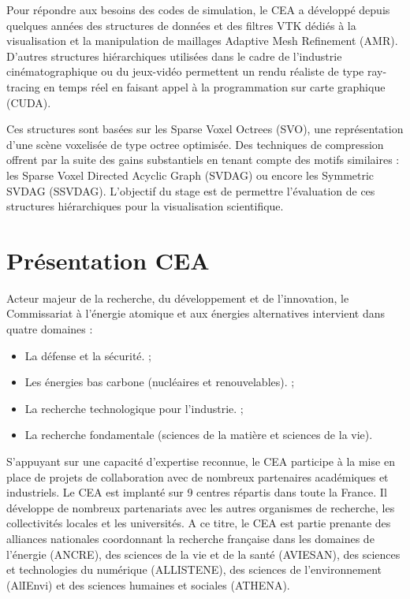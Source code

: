 \documentclass[12pt,a4paper,twoside]{article}
\begin{document}
    Pour répondre aux besoins des codes de simulation, le CEA a développé depuis quelques années des
    structures de données et des filtres VTK dédiés à la visualisation et la manipulation de maillages Adaptive Mesh Refinement (AMR). D’autres
    structures hiérarchiques utilisées dans le cadre de l’industrie cinématographique ou du jeux-vidéo permettent un rendu
    réaliste de type ray-tracing en temps réel en faisant appel à la programmation sur carte graphique (CUDA).

    Ces structures
    sont basées sur les Sparse Voxel Octrees (SVO), une représentation d’une scène voxelisée de type octree optimisée.
    Des techniques de compression offrent par la suite des gains substantiels en tenant compte des motifs similaires :
    les Sparse Voxel Directed Acyclic Graph (SVDAG) ou encore les Symmetric SVDAG (SSVDAG).
    L’objectif du stage est de permettre l’évaluation de ces structures hiérarchiques pour la visualisation scientifique.

    \newpage

    \section{Présentation CEA}                              %

    Acteur majeur de la recherche, du développement et de l'innovation, le Commissariat à l’énergie atomique et aux énergies alternatives intervient dans quatre domaines :

    \begin{itemize}[label=\textbullet]
        \item    La défense et la sécurité. ;
        \item    Les énergies bas carbone (nucléaires et renouvelables). ;
        \item    La recherche technologique pour l’industrie. ;
        \item    La recherche fondamentale (sciences de la matière et sciences de la vie).
    \end{itemize}

    S’appuyant sur une capacité d’expertise reconnue, le CEA participe à la mise en place de projets de collaboration
    avec de nombreux partenaires académiques et industriels. Le CEA est implanté sur 9 centres répartis dans toute la
    France. Il développe de nombreux partenariats avec les autres organismes de recherche, les collectivités locales
    et les universités. A ce titre, le CEA est partie prenante des alliances nationales coordonnant la recherche
    française dans les domaines de l’énergie (ANCRE), des sciences de la vie et de la santé (AVIESAN), des sciences
    et technologies du numérique (ALLISTENE), des sciences de l’environnement (AlIEnvi) et des sciences humaines et
    sociales (ATHENA).
\end{document}
